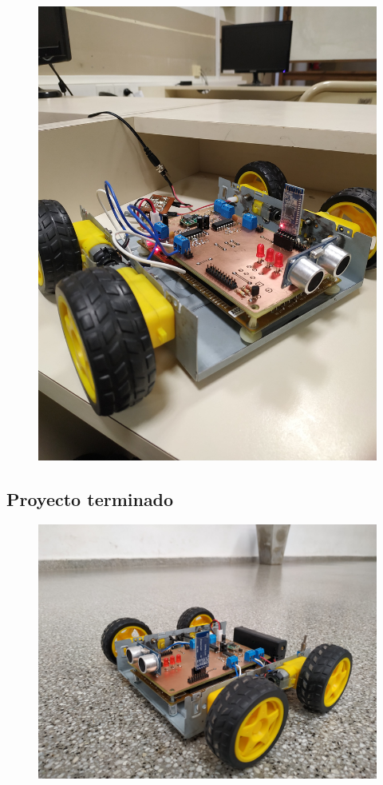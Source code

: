 \begin{figure}[H]
\centering
\includegraphics[width=0.9\linewidth]{imagenes/final_con_fuente_reguladora.jpg}
\label{fig:final5}
\end{figure}

\subsection{Proyecto terminado}

\begin{figure}[H]
	\centering
	\includegraphics[width=0.9\linewidth]{imagenes/final4.jpg}
	\label{fig:final4}
\end{figure}

